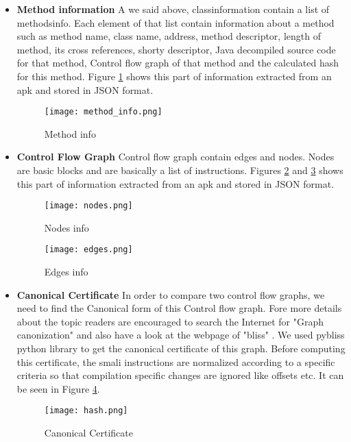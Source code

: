 \documentclass[../main.tex]{subfile}
\begin{document}
\begin{itemize}
			
			\item \textbf{Method information} A we said above, class\textunderscore information contain a list of methods\textunderscore info. Each element of that list contain information about a method such as method name, class name, address, method descriptor, length of method, its cross references, shorty descriptor, Java decompiled source code for that method, Control flow graph of that method and the calculated hash for this method. Figure \ref{fig:method_info} shows this part of information extracted from an apk and stored in JSON format.
			\begin{figure}
				\texttt{[image: method\_info.png]}
				\caption{Method info}
				\label{fig:method_info}	
			\end{figure}
			\item \textbf{Control Flow Graph} Control flow graph contain edges and nodes. Nodes are basic blocks and are basically a list of instructions. Figures \ref{fig:nodes_info} and \ref{fig:edges_info} shows this part of information extracted from an apk and stored in JSON format.

			\begin{figure}
				\texttt{[image: nodes.png]}
				\caption{Nodes info}
				\label{fig:nodes_info}	
			\end{figure}

			\begin{figure}
				\texttt{[image: edges.png]}
				\caption{Edges info}
				\label{fig:edges_info}	
			\end{figure}
		

			\item \textbf{Canonical Certificate} In order to compare two control flow graphs, we need to find the Canonical form of this Control flow graph. Fore more details about the topic readers are encouraged to search the Internet for "Graph canonization" and also have a look at the webpage of "bliss" \cite{bliss}. We used pybliss python library \cite{bliss} \cite{junttila2007engineering} to get the canonical certificate of this graph. Before computing this certificate, the smali instructions are normalized according to a specific criteria so that compilation specific changes are ignored like offsets etc. It can be seen in Figure \ref{fig:hash_info}.
			\begin{figure}
				\texttt{[image: hash.png]}
				\caption{Canonical Certificate}
				\label{fig:hash_info}	
			\end{figure}
		\end{itemize}
		
\end{document}

